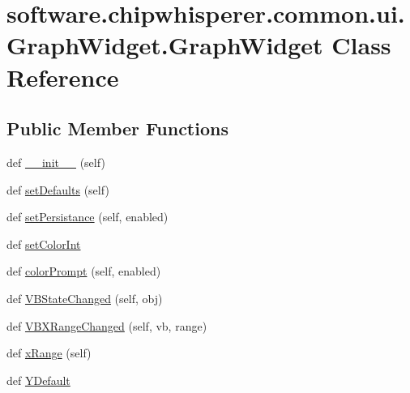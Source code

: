 \hypertarget{classsoftware_1_1chipwhisperer_1_1common_1_1ui_1_1GraphWidget_1_1GraphWidget}{}\section{software.\+chipwhisperer.\+common.\+ui.\+Graph\+Widget.\+Graph\+Widget Class Reference}
\label{classsoftware_1_1chipwhisperer_1_1common_1_1ui_1_1GraphWidget_1_1GraphWidget}
\subsection*{Public Member Functions}
\begin{DoxyCompactItemize}
\item 
def \hyperlink{classsoftware_1_1chipwhisperer_1_1common_1_1ui_1_1GraphWidget_1_1GraphWidget_a99051eb11b85b8acb92d52aa16848922}{\+\_\+\+\_\+init\+\_\+\+\_\+} (self)
\item 
def \hyperlink{classsoftware_1_1chipwhisperer_1_1common_1_1ui_1_1GraphWidget_1_1GraphWidget_a6b4b2d7d0c35087e932647727a703f4f}{set\+Defaults} (self)
\item 
def \hyperlink{classsoftware_1_1chipwhisperer_1_1common_1_1ui_1_1GraphWidget_1_1GraphWidget_add39cf0558f1ca0bcd6e27b6e41ce081}{set\+Persistance} (self, enabled)
\item 
def \hyperlink{classsoftware_1_1chipwhisperer_1_1common_1_1ui_1_1GraphWidget_1_1GraphWidget_aff9b5a6c1876a894dccd2cdea3d13be9}{set\+Color\+Int}
\item 
def \hyperlink{classsoftware_1_1chipwhisperer_1_1common_1_1ui_1_1GraphWidget_1_1GraphWidget_a1d10774847432f66f8ec78ef5eee1c29}{color\+Prompt} (self, enabled)
\item 
def \hyperlink{classsoftware_1_1chipwhisperer_1_1common_1_1ui_1_1GraphWidget_1_1GraphWidget_acdc18c92cffa1d65a786af9cb7364fd5}{V\+B\+State\+Changed} (self, obj)
\item 
def \hyperlink{classsoftware_1_1chipwhisperer_1_1common_1_1ui_1_1GraphWidget_1_1GraphWidget_abb739f7c6cec310eedba8a54feac089d}{V\+B\+X\+Range\+Changed} (self, vb, range)
\item 
def \hyperlink{classsoftware_1_1chipwhisperer_1_1common_1_1ui_1_1GraphWidget_1_1GraphWidget_a5862d3bf63358ca210c294e21ec36fbf}{x\+Range} (self)
\item 
def \hyperlink{classsoftware_1_1chipwhisperer_1_1common_1_1ui_1_1GraphWidget_1_1GraphWidget_acedda9d54624de40cd0b6875fe9ade64}{Y\+Default}

\end{DoxyCompactItemize}
